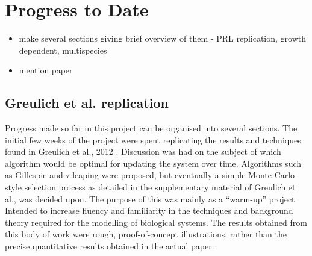 \documentclass[a4paper,12pt]{article}
\begin{document}
% 
% 
% 

\section{Progress to Date}

\begin{itemize}
 \item make several sections giving brief overview of them - PRL replication, growth dependent, multispecies 
 \item mention paper
\end{itemize}



\subsection{Greulich et al. replication}

Progress made so far in this project can be organised into several sections.  The initial few weeks of the project 
were spent replicating the results and techniques found in Greulich et al., 2012 \cite{bioref:PRL-drugGradients}.  Discussion was had
on the subject of which algorithm would be optimal for updating the system over time.  Algorithms such as Gillespie \cite{bioref:Gillespie-algorithm} 
and $\tau$-leaping \cite{bioref:tau-leap-algorithm} were proposed, but eventually a simple Monte-Carlo style selection process as detailed in the supplementary material 
of Greulich et al., was decided upon.  The purpose of this was mainly as a ``warm-up'' project.  Intended to increase fluency and familiarity in the techniques and background 
theory required for the modelling of biological systems.  The results obtained from this body of work were rough, proof-of-concept illustrations, rather than the precise 
quantitative results obtained in the actual paper.
\end{document}
